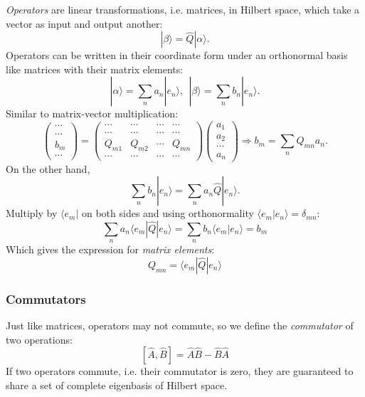 	\emph{Operators} are linear transformations, i.e. matrices, in Hilbert space, which take a vector as input and output another:
	\[|\beta\rangle = \hat{Q}|\alpha\rangle.\]
	Operators can be written in their coordinate form under an orthonormal basis like matrices with their matrix elements:
	\[|\alpha\rangle = \sum_{n}a_n|e_n\rangle, \ \ |\beta\rangle = \sum_{n}b_n|e_n\rangle.\]
	Similar to matrix-vector multiplication:
	\[\begin{pmatrix}
		\cdots\\\cdots\\b_m\\\cdots
	\end{pmatrix} = 
	\begin{pmatrix}
		\cdots & \cdots & \cdots & \cdots \\ 
		\cdots & \cdots & \cdots & \cdots \\
		Q_{m1} & Q_{m2} & \cdots & Q_{mn} \\
		\cdots & \cdots & \cdots & \cdots
	\end{pmatrix}
	\begin{pmatrix}
		a_1\\a_2\\\cdots\\a_n
	\end{pmatrix} \Rightarrow
	b_m = \sum_{n}Q_{mn}a_n.\]
	On the other hand, \[ \sum_{n} b_n|e_n\rangle = \sum_{n} a_n\hat{Q}|e_n\rangle.\]
	Multiply by $\langle e_m | $ on both sides and using orthonormality $\langle e_m | e_n \rangle = \delta_{mn}$:
	\[\sum_{n} a_n\langle e_m | \hat{Q} | e_n \rangle = \sum_{n} b_n \langle e_m | e_n \rangle = b_m\]
	Which gives the expression for \emph{matrix elements}:
	\[Q_{mn} = \langle e_m | \hat{Q} | e_n \rangle\]
	\subsubsection{Commutators}
	Just like matrices, operators may not commute, so we define the \emph{commutator} of two operations:
	\[[ \hat{A}, \hat{B}] = \hat{A}\hat{B} - \hat{B}\hat{A}\]
	If two operators commute, i.e. their commutator is zero, they are guaranteed to share a set of complete eigenbasis of Hilbert space.\label{commutator}
